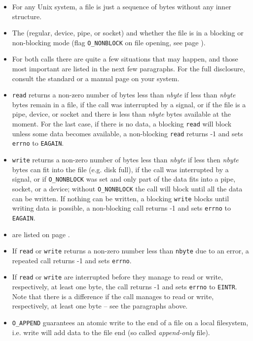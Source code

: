 \begin{itemize}
\setlength{\itemsep}{0.8\itemsep}
\item For any Unix system, a file is just a sequence of bytes without any inner
structure.
\item The  (regular, device, pipe, or socket) and whether the file is in a
blocking or non-blocking mode (flag \texttt{O\_NONBLOCK} on file opening, see
page \pageref{O_NONBLOCK}).
\item For both calls there are quite a few situations that may happen, and
those most important are listed in the next few paragraphs.  For the full
disclosure, consult the standard or a manual page on your system.
\item \texttt{read} returns a non-zero number of bytes less than \emph{nbyte} if
less than \emph{nbyte} bytes remain in a file, if the call was interrupted
by a signal, or if the file is a pipe, device, or socket and there is less than
\emph{nbyte} bytes available at the moment.  For the last case, if there is no
data, a blocking \texttt{read} will block unless some data becomes available, a
non-blocking \texttt{read} returns -1 and sets \texttt{errno} to
\texttt{EAGAIN}.
\item \texttt{write} returns a non-zero number of bytes less than \emph{nbyte}
if less then \emph{nbyte} bytes can fit into the file (e.g. disk full), if the call
was interrupted by a signal, or if \verb#O_NONBLOCK# was set and only part of
the data fits into a pipe, socket, or a device; without \verb#O_NONBLOCK#
the call will block until all the data can be written.  If nothing can be
written, a blocking \texttt{write} blocks until writing data is possible, a
non-blocking call returns -1 and sets \texttt{errno} to \texttt{EAGAIN}.
\item {} are listed on page
\pageref{NAMEDPIPE}.
\item
If \texttt{read} or \texttt{write} returns a non-zero number less than
\texttt{nbyte} due to an error, a repeated call returns -1 and sets
\texttt{errno}.
\item If \texttt{read} or \texttt{write} are interrupted before they manage to
read or write, respectively, at least one byte, the call returns -1 and sets
\texttt{errno} to \texttt{EINTR}.  Note that there is a difference if the call
manages to read or write, respectively, at least one byte -- see the paragraphs
above.
\item \texttt{O\_APPEND} guarantees an atomic write to the end of a file on a
local filesystem, i.e.  write will add data to the file end (so
called \emph{append-only} file).
\end{itemize}


